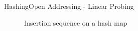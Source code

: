 \begin{frame}{Hashing}{Open Addressing - Linear Probing}
\begin{itemize}
\begin{figure}[!h]
        \def\LPEData{
          \relax/0,
          \relax/1,
          \relax/2,
          \relax/3,
          {53, {\color{green2}B}}/4,
          {12, {\color{green2}A}}/5,
          \relax/6
        }%
        \def\LPEShowIndex{0}%
        \begin{adjustbox}{width=0.75\linewidth}%
        \end{adjustbox}
        \vspace{-0.5em}%
        \caption{Insertion sequence on a hash map}%
        \label{fig:hashing:open_addressing:linear_probing_example2}%
      \end{figure}
  \end{itemize}
\end{frame}


